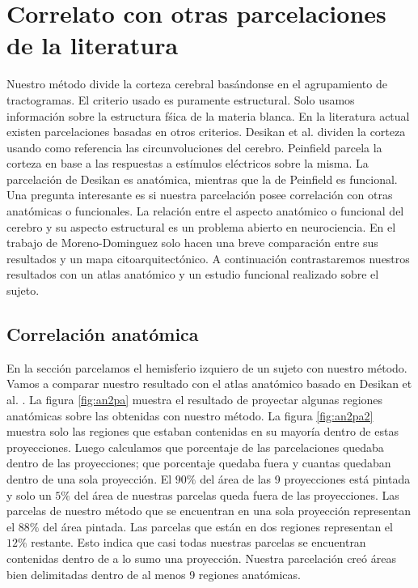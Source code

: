 \section{Correlato con otras parcelaciones de la literatura}

Nuestro m\'etodo divide la corteza cerebral bas\'andonse en el 
agrupamiento de tractogramas. El criterio usado es puramente estructural.
Solo usamos informaci\'on sobre la estructura f\'sica de la materia
blanca. En la literatura actual existen parcelaciones basadas en otros
criterios. Desikan et al. \cite{Desikan2006} dividen la corteza usando
como referencia las circunvoluciones del cerebro. Peinfield 
\cite{Penfield1954} parcela la corteza en base a las respuestas a 
est\'imulos el\'ectricos sobre la misma. La parcelaci\'on de Desikan es
anat\'omica, mientras que la de Peinfield es funcional. Una pregunta
interesante es si nuestra parcelaci\'on posee correlaci\'on con otras
anat\'omicas o funcionales. La relaci\'on entre el aspecto anat\'omico o
funcional del cerebro y su aspecto estructural es un problema abierto en
neurociencia.  En el trabajo de Moreno-Dominguez solo hacen una breve
comparaci\'on entre sus resultados y un mapa citoarquitect\'onico. A 
continuaci\'on contrastaremos nuestros resultados con un atlas anat\'omico
y un estudio funcional realizado sobre el sujeto.  \\


\subsection{Correlaci\'on anat\'omica}
\label{sec:corr_anatomica}

En la secci\'on \label{sec:corteza_nuestro} parcelamos el hemisferio 
izquiero de un sujeto con nuestro m\'etodo. Vamos a comparar nuestro
resultado con el atlas anat\'omico basado en Desikan et al. 
\cite{Desikan2006}. La figura \ref{fig:an2pa} muestra el resultado de proyectar algunas regiones anat\'omicas sobre las obtenidas con nuestro
m\'etodo. La figura \ref{fig:an2pa2} muestra solo las regiones que estaban
contenidas en su mayor\'ia dentro de estas proyecciones. Luego calculamos
que porcentaje de las parcelaciones quedaba dentro de las proyecciones;
que porcentaje quedaba fuera y cuantas quedaban dentro de una sola 
proyecci\'on. El $90\%$ del \'area de las 9 proyecciones est\'a pintada y
solo un $5\%$ del \'area de nuestras parcelas queda fuera de las
proyecciones. Las parcelas de nuestro m\'etodo que se encuentran en una
sola proyecci\'on representan el $88\%$ del \'area pintada. Las parcelas
que est\'an en dos regiones representan el $12\%$ restante. Esto indica
que casi todas nuestras parcelas se encuentran contenidas dentro de a lo
sumo una proyecci\'on. Nuestra parcelaci\'on cre\'o \'areas bien
delimitadas dentro de al menos 9 regiones anat\'omicas. \\


